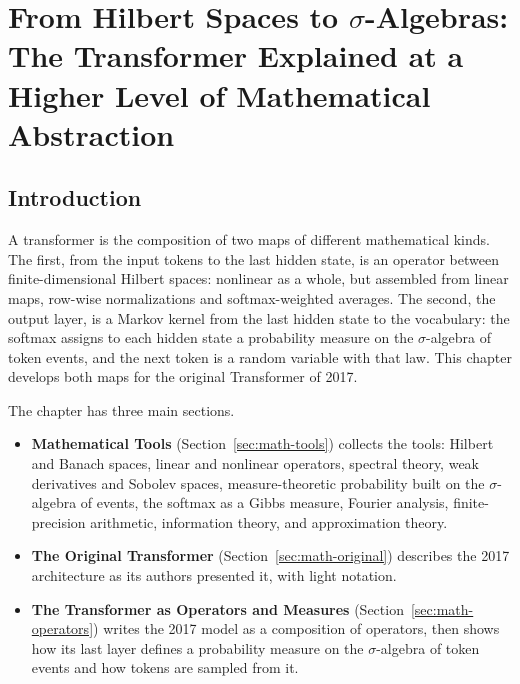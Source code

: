\chapter{\texorpdfstring{From Hilbert Spaces to \(\sigma\)-Algebras: The Transformer Explained at a Higher Level of Mathematical Abstraction}{From Hilbert Spaces to Sigma-Algebras: The Transformer Explained at a Higher Level of Mathematical Abstraction}}
\label{ch:math-transformers}

\section{Introduction}

A transformer is the composition of two maps of different mathematical
kinds. The first, from the input tokens to the last hidden state, is an
operator between finite-dimensional Hilbert spaces: nonlinear as a
whole, but assembled from linear maps, row-wise normalizations and
softmax-weighted averages. The second, the output layer, is a Markov
kernel from the last hidden state to the vocabulary: the softmax assigns
to each hidden state a probability measure on the \(\sigma\)-algebra of token
events, and the next token is a random variable with that law. This
chapter develops both maps for the original Transformer of 2017.

The chapter has three main sections.

\begin{itemize}
\tightlist
\item
  \textbf{Mathematical Tools} (Section~\ref{sec:math-tools}) collects the tools: Hilbert
  and Banach spaces, linear and nonlinear operators, spectral theory,
  weak derivatives and Sobolev spaces, measure-theoretic probability
  built on the \(\sigma\)-algebra of events, the softmax as a Gibbs measure,
  Fourier analysis, finite-precision arithmetic, information theory, and
  approximation theory.
\item
  \textbf{The Original Transformer} (Section~\ref{sec:math-original}) describes the 2017
  architecture as its authors presented it, with light notation.
\item
  \textbf{The Transformer as Operators and Measures}
  (Section~\ref{sec:math-operators}) writes the 2017 model as a composition of operators, then shows
  how its last layer defines a probability measure on the \(\sigma\)-algebra of
  token events and how tokens are sampled from it.
\end{itemize}

